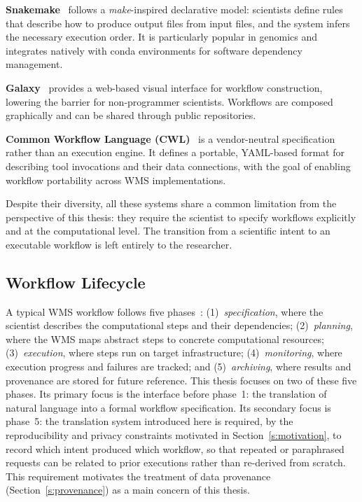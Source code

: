 \textbf{Snakemake}~\cite{molder2021snakemake} follows a \emph{make}-inspired
declarative model: scientists define rules that describe how to produce output
files from input files, and the system infers the necessary execution order.
It is particularly popular in genomics and integrates natively with conda
environments for software dependency management.

\textbf{Galaxy}~\cite{afgan2018galaxy} provides a web-based visual interface
for workflow construction, lowering the barrier for non-programmer scientists.
Workflows are composed graphically and can be shared through public repositories.

\textbf{Common Workflow Language (CWL)}~\cite{crusoe2022cwl} is a
vendor-neutral specification rather than an execution engine. It defines a
portable, YAML-based format for describing tool invocations and their data
connections, with the goal of enabling workflow portability across WMS
implementations.

Despite their diversity, all these systems share a common limitation from the
perspective of this thesis: they require the scientist to specify workflows
explicitly and at the computational level. The transition from a scientific
intent to an executable workflow is left entirely to the researcher.

\subsection{Workflow Lifecycle}

A typical WMS workflow follows five phases~\cite{deelman2015pegasus}:
(1)~\emph{specification}, where the scientist describes the computational steps
and their dependencies; (2)~\emph{planning}, where the WMS maps abstract steps
to concrete computational resources; (3)~\emph{execution}, where steps run on
target infrastructure; (4)~\emph{monitoring}, where execution progress and
failures are tracked; and (5)~\emph{archiving}, where results and provenance
are stored for future reference. This thesis focuses on two of these five
phases. Its primary focus is the interface before phase~1: the translation of
natural language into a formal workflow specification. Its secondary focus is
phase~5: the translation system introduced here is required, by the
reproducibility and privacy constraints motivated in
Section~\ref{s:motivation}, to record which intent produced which workflow, so
that repeated or paraphrased requests can be related to prior executions
rather than re-derived from scratch. This requirement motivates the treatment of data provenance
(Section~\ref{s:provenance}) as a main concern of this thesis.

